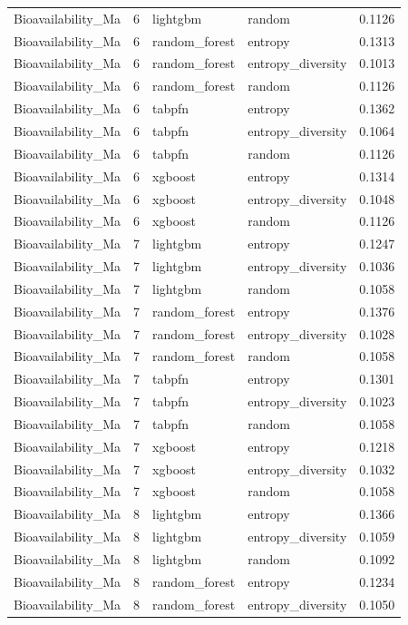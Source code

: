 \begin{tabular}{lrllr}
Bioavailability_Ma & 6 & lightgbm & random & 0.1126 \\
Bioavailability_Ma & 6 & random_forest & entropy & 0.1313 \\
Bioavailability_Ma & 6 & random_forest & entropy_diversity & 0.1013 \\
Bioavailability_Ma & 6 & random_forest & random & 0.1126 \\
Bioavailability_Ma & 6 & tabpfn & entropy & 0.1362 \\
Bioavailability_Ma & 6 & tabpfn & entropy_diversity & 0.1064 \\
Bioavailability_Ma & 6 & tabpfn & random & 0.1126 \\
Bioavailability_Ma & 6 & xgboost & entropy & 0.1314 \\
Bioavailability_Ma & 6 & xgboost & entropy_diversity & 0.1048 \\
Bioavailability_Ma & 6 & xgboost & random & 0.1126 \\
Bioavailability_Ma & 7 & lightgbm & entropy & 0.1247 \\
Bioavailability_Ma & 7 & lightgbm & entropy_diversity & 0.1036 \\
Bioavailability_Ma & 7 & lightgbm & random & 0.1058 \\
Bioavailability_Ma & 7 & random_forest & entropy & 0.1376 \\
Bioavailability_Ma & 7 & random_forest & entropy_diversity & 0.1028 \\
Bioavailability_Ma & 7 & random_forest & random & 0.1058 \\
Bioavailability_Ma & 7 & tabpfn & entropy & 0.1301 \\
Bioavailability_Ma & 7 & tabpfn & entropy_diversity & 0.1023 \\
Bioavailability_Ma & 7 & tabpfn & random & 0.1058 \\
Bioavailability_Ma & 7 & xgboost & entropy & 0.1218 \\
Bioavailability_Ma & 7 & xgboost & entropy_diversity & 0.1032 \\
Bioavailability_Ma & 7 & xgboost & random & 0.1058 \\
Bioavailability_Ma & 8 & lightgbm & entropy & 0.1366 \\
Bioavailability_Ma & 8 & lightgbm & entropy_diversity & 0.1059 \\
Bioavailability_Ma & 8 & lightgbm & random & 0.1092 \\
Bioavailability_Ma & 8 & random_forest & entropy & 0.1234 \\
Bioavailability_Ma & 8 & random_forest & entropy_diversity & 0.1050 \\

\end{tabular}
